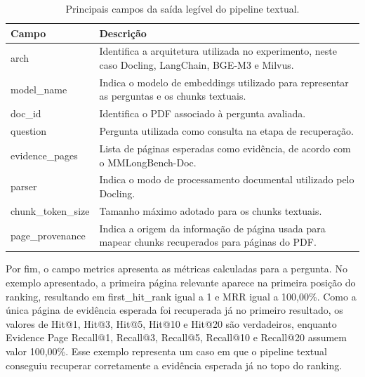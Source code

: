 \begin{table}[htbp]
\centering
\caption{Principais campos da saída legível do pipeline textual.}
\label{tab:saida-textual-readable}
\small
\renewcommand{\arraystretch}{1.2}
\begin{tabular}{|p{4.2cm}|p{9.0cm}|}
\hline
\textbf{Campo} & \textbf{Descrição} \\
\hline
arch & Identifica a arquitetura utilizada no experimento, neste caso Docling, LangChain, BGE-M3 e Milvus. \\
\hline
model\_name & Indica o modelo de embeddings utilizado para representar as perguntas e os chunks textuais. \\
\hline
doc\_id & Identifica o PDF associado à pergunta avaliada. \\
\hline
question & Pergunta utilizada como consulta na etapa de recuperação. \\
\hline
evidence\_pages & Lista de páginas esperadas como evidência, de acordo com o MMLongBench-Doc. \\
\hline
parser & Indica o modo de processamento documental utilizado pelo Docling. \\
\hline
chunk\_token\_size & Tamanho máximo adotado para os chunks textuais. \\
\hline
page\_provenance & Indica a origem da informação de página usada para mapear chunks recuperados para páginas do PDF. \\
\hline
\end{tabular}
\end{table}


Por fim, o campo metrics apresenta as métricas calculadas para a pergunta. No exemplo apresentado, a primeira página relevante aparece na primeira posição do ranking, resultando em first\_hit\_rank igual a 1 e MRR igual a 100,00\%. Como a única página de evidência esperada foi recuperada já no primeiro resultado, os valores de Hit@1, Hit@3, Hit@5, Hit@10 e Hit@20 são verdadeiros, enquanto Evidence Page Recall@1, Recall@3, Recall@5, Recall@10 e Recall@20 assumem valor 100,00\%. Esse exemplo representa um caso em que o pipeline textual conseguiu recuperar corretamente a evidência esperada já no topo do ranking.


